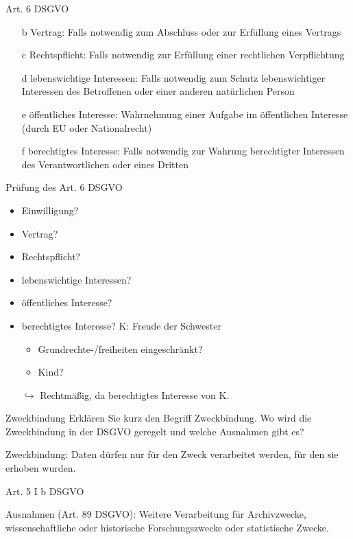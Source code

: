 \documentclass{exercisesheet}
\begin{document}
\begin{solutions}
  \item Art. 6 DSGVO
  \begin{itemize}
    \item[b] Vertrag: Falls notwendig zum Abschluss oder zur Erfüllung eines Vertrags
    \item[c] Rechtspflicht: Falls notwendig zur Erfüllung einer rechtlichen Verpflichtung
    \item[d] lebenswichtige Interessen: Falls notwendig zum Schutz lebenswichtiger Interessen des Betroffenen oder einer anderen natürlichen Person
    \item[e] öffentliches Interesse: Wahrnehmung einer Aufgabe im öffentlichen Interesse (durch EU oder Nationalrecht)
    \item[f] berechtigtes Interesse: Falls notwendig zur Wahrung berechtigter Interessen des Verantwortlichen oder eines Dritten
  \end{itemize}
  \item Prüfung des Art. 6 DSGVO
  \begin{itemize}
    \item Einwilligung? \xmark
    \item Vertrag? \xmark
    \item Rechtspflicht? \xmark
    \item lebenswichtige Interessen? \xmark
    \item öffentliches Interesse? \xmark
    \item berechtigtes Interesse? K: Freude der Schwester \checkmark
          \begin{itemize}
            \item Grundrechte-/freiheiten eingeschränkt? \xmark
            \item Kind? \xmark
          \end{itemize}
    \item[$\hookrightarrow$] Rechtmäßig, da berechtigtes Interesse von K.
  \end{itemize}
\end{solutions}

\begin{exercise}{Zweckbindung}
  Erklären Sie kurz den Begriff Zweckbindung. Wo wird die Zweckbindung in der DSGVO geregelt und welche Ausnahmen gibt es?

  \begin{solution}
    Zweckbindung: Daten dürfen nur für den Zweck verarbeitet werden, für den sie erhoben wurden.\par
    Art. 5 I b DSGVO\par
    Ausnahmen (Art. 89 DSGVO): Weitere Verarbeitung für Archivzwecke, wissenschaftliche oder historische Forschungszwecke oder statistische Zwecke.
  \end{solution}
\end{exercise}
\end{document}
